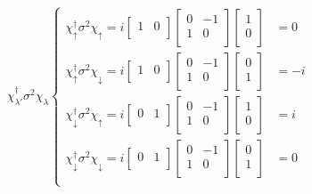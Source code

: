 \documentclass[letter,twoside,12pt]{book}
\begin{document}
\begin{equation}
    \chi_{\lambda'}^{\dagger}\sigma^2\chi_{\lambda}
    \left\{
    \begin{aligned}
    \chi_{\uparrow}^{\dagger}\sigma^2\chi_{\uparrow}=i\begin{bmatrix}
    1 & 0\\
    \end{bmatrix}\begin{bmatrix}
    0 & -1\\
    1 & 0\\
    \end{bmatrix}\begin{bmatrix}
    1\\
    0\\
    \end{bmatrix} & = 0\\
    \chi_{\uparrow}^{\dagger}\sigma^2\chi_{\downarrow}=i\begin{bmatrix}
    1 & 0\\
    \end{bmatrix}\begin{bmatrix}
    0 & -1\\
    1 & 0\\
    \end{bmatrix}\begin{bmatrix}
    0\\
    1\\
    \end{bmatrix} & = -i\\
    \chi_{\downarrow}^{\dagger}\sigma^2\chi_{\uparrow}=i\begin{bmatrix}
    0 & 1\\
    \end{bmatrix}\begin{bmatrix}
    0 & -1\\
    1 & 0\\
    \end{bmatrix}\begin{bmatrix}
    1\\
    0\\
    \end{bmatrix} & = i\\
    \chi_{\downarrow}^{\dagger}\sigma^2\chi_{\downarrow}=i\begin{bmatrix}
    0 & 1\\
    \end{bmatrix}\begin{bmatrix}
    0 & -1\\
    1 & 0\\
    \end{bmatrix}\begin{bmatrix}
    0\\
    1\\
    \end{bmatrix} & = 0\\
    \end{aligned}
    \right. \nonumber
\end{equation}
\end{document}
